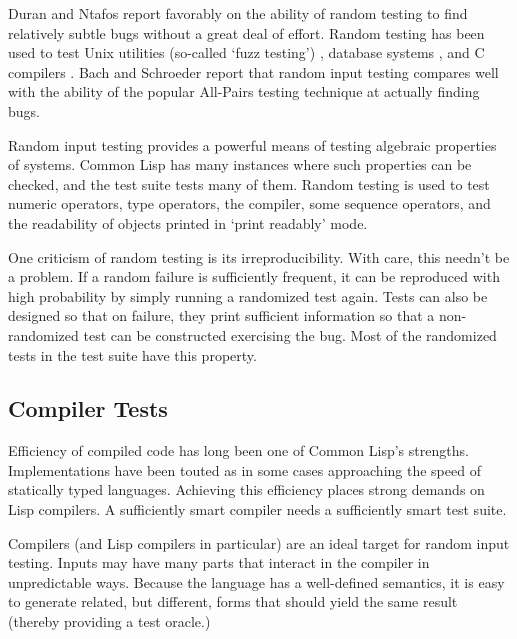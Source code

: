 \documentclass[11pt]{article}
\begin{document}
Duran and Ntafos \cite{DuranNtafos:81} report favorably on the ability
of random testing to find relatively subtle bugs without a great deal
of effort.  Random testing has been used to test Unix utilities
(so-called `fuzz testing') \cite{MillerFredriksenSo:90}, database
systems \cite{Slutz:98}, and C compilers \cite{McKeeman:98,Lindig:05,Faigon:05}.
Bach and Schroeder \cite{BachSchroeder:04} report that random input
testing compares well with the ability of the popular All-Pairs
testing technique at actually finding bugs.

Random input testing provides a powerful means of testing algebraic
properties of systems.  Common Lisp has many instances where such
properties can be checked, and the test suite tests many of them.
Random testing is used to test numeric operators, type operators,
the compiler, some sequence operators, and the readability of
objects printed in `print readably' mode.

One criticism of random testing is its irreproducibility.
With care, this needn't be a problem.  If a random failure
is sufficiently frequent, it can be reproduced with high
probability by simply running a randomized test again.  Tests
can also be designed so that on failure, they print sufficient
information so that a non-randomized test can be constructed
exercising the bug.  Most of the randomized tests in the test
suite have this property.

\subsection {Compiler Tests}
\label{sec:compilertests}

Efficiency of compiled code has long been one of Common Lisp's
strengths.  Implementations have been touted as in some cases
approaching the speed of statically typed languages.  Achieving this
efficiency places strong demands on Lisp compilers.  A sufficiently
smart compiler needs a sufficiently smart test suite.

Compilers (and Lisp compilers in particular) are an ideal target for
random input testing.  Inputs may have many parts that interact in
the compiler in unpredictable ways.  Because the language has a
well-defined semantics, it is easy to generate related, but different,
forms that should yield the same result (thereby providing a test
oracle.)
\end{document}
